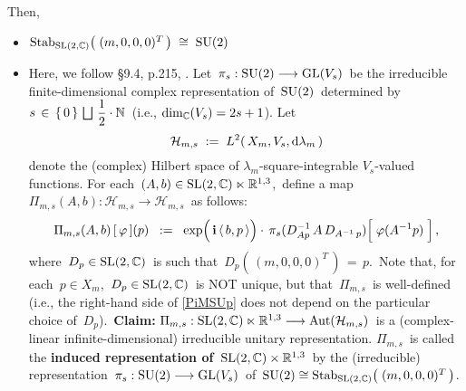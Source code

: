 \vskip 0.5cm
\noindent
Then,
\begin{itemize}
\item
	$\textnormal{Stab}_{\textnormal{SL}(2,\mathbb{C})}\!\left(\;(m,0,0,0)^{T}\,\right) \;\cong\; \textnormal{SU}(2)$
\item
	Here, we follow \S9.4, p.215, \cite{Talagrand2022}.
	Let
	\,$\pi_{s} : \textnormal{SU}(2) \longrightarrow \textnormal{GL}(V_{s})$\,
	be the irreducible finite-dimensional complex representation of \,$\textnormal{SU}(2)$\,
	determined by
	\,$s \,\in\, \{\,0\,\} \,\bigsqcup\, \dfrac{1}{2}\cdot\mathbb{N}$\,
	(i.e., $\dim_{\mathbb{C}}(V_{s}) = 2s + 1$).
	Let
	\begin{equation*}
	\mathcal{H}_{m,s}
	\; := \;
		L^{2}\!\left(\,X_{m},V_{s},\textnormal{d}\lambda_{m}\,\right)
	\end{equation*}
	denote the (complex) Hilbert space of $\lambda_{m}$-square-integrable
	$V_{s}$-valued functions.
	For each
	\,$(A,b) \in \textnormal{SL}(2,\mathbb{C}) \ltimes \mathbb{R}^{1,3}$,\,
	define a map
	\,$\Pi_{m,s}\!\left(A,b\right) : \mathcal{H}_{m,s} \longrightarrow \mathcal{H}_{m,s}$\,
	as follows:
	\begin{equation}\label{PiMSUp}
	\Pi_{m,s}\!\left(A,b\right)[\,\varphi\,](p)
	\;\; := \;\;
		\exp\!\left(\,\overset{{\color{white}.}}{\i}\,\langle\,b,p\,\rangle\right)
		\cdot\,
		\pi_{s}(D^{-1}_{Ap}\,A\,D_{A^{-1}\,p})\!\left[\;
			\overset{{\color{white}.}}{\varphi(A^{-1}p)}
			\;\right],
	\end{equation}
	where
	\,$D_{p} \in \textnormal{SL}(2,\mathbb{C})$\, is such that \,$D_{p}\!\left(\,(m,0,0,0)^{T}\,\right) \,=\, p$.\,
	Note that, for each \,$p \in X_{m}$,\, $D_{p} \in \textnormal{SL}(2,\mathbb{C})$\, is NOT unique,
	but that \,$\Pi_{m,s}$\, is well-defined
	(i.e., the right-hand side of \eqref{PiMSUp} does not depend on the particular choice of \,$D_{p}$).\,
	\vskip 0.1cm
	\textbf{Claim:}\;
	$\Pi_{m,s} : \textnormal{SL}(2,\mathbb{C}) \ltimes \mathbb{R}^{1,3} \longrightarrow \textnormal{Aut}\!\left(\mathcal{H}_{m,s}\right)$\,
	is a (complex-linear infinite-dimensional) irreducible unitary representation.
	\vskip 0.1cm
	$\Pi_{m,s}$\, is called the \textbf{induced representation of \,$\textnormal{SL}(2,\mathbb{C}) \times \mathbb{R}^{1,3}$}\,
	by the (irreducible) representation
	\,$\pi_{s} : \textnormal{SU}(2) \longrightarrow \textnormal{GL}(V_{s})$\,
	of
	\,$\textnormal{SU}(2) \cong \textnormal{Stab}_{\textnormal{SL}(2,\mathbb{C})}\!\left(\;(m,0,0,0)^{T}\,\right)$.\,
\end{itemize}



